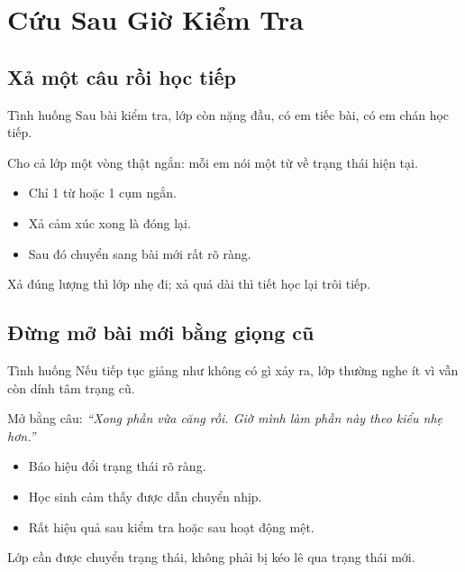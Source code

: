 \chapter{Cứu Sau Giờ Kiểm Tra}

\section{Xả một câu rồi học tiếp}
\begin{tinhhuong}{Tình huống}
Sau bài kiểm tra, lớp còn nặng đầu, có em tiếc bài, có em chán học tiếp.
\end{tinhhuong}
\begin{goiydungngay}
Cho cả lớp một vòng thật ngắn: mỗi em nói một từ về trạng thái hiện tại.
\begin{itemize}
\item Chỉ 1 từ hoặc 1 cụm ngắn.
\item Xả cảm xúc xong là đóng lại.
\item Sau đó chuyển sang bài mới rất rõ ràng.
\end{itemize}
\end{goiydungngay}
\begin{cauchot}
Xả đúng lượng thì lớp nhẹ đi; xả quá dài thì tiết học lại trôi tiếp.
\end{cauchot}
\ngancach

\section{Đừng mở bài mới bằng giọng cũ}
\begin{tinhhuong}{Tình huống}
Nếu tiếp tục giảng như không có gì xảy ra, lớp thường nghe ít vì vẫn còn dính tâm trạng cũ.
\end{tinhhuong}
\begin{goiydungngay}
Mở bằng câu: \textit{``Xong phần vừa căng rồi. Giờ mình làm phần này theo kiểu nhẹ hơn.''}
\begin{itemize}
\item Báo hiệu đổi trạng thái rõ ràng.
\item Học sinh cảm thấy được dẫn chuyển nhịp.
\item Rất hiệu quả sau kiểm tra hoặc sau hoạt động mệt.
\end{itemize}
\end{goiydungngay}
\begin{cauchot}
Lớp cần được chuyển trạng thái, không phải bị kéo lê qua trạng thái mới.
\end{cauchot}
\ngancach

